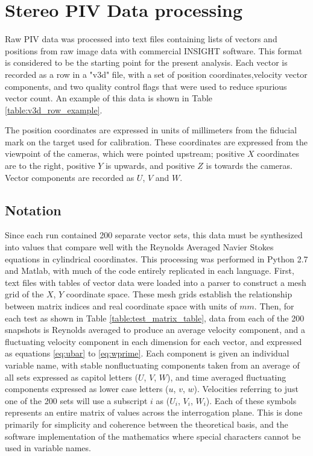 \section{Stereo PIV Data processing}

Raw PIV data was processed into text files containing lists of vectors and 
positions from raw image data with commercial INSIGHT software. 
This format is considered to be the 
starting point for the present analysis. Each vector is recorded as a row in a 
"v3d" file, with a set of position coordinates,velocity 
vector components, and two quality control flags that were used to reduce 
spurious vector count. An example of this data is shown in Table 
\ref{table:v3d_row_example}.



The position coordinates are expressed in units of millimeters from 
the fiducial mark on the target used for calibration. These coordinates are 
expressed from the viewpoint of the cameras, which were pointed upstream; 
positive $X$ coordinates are to the right, positive $Y$ is upwards, and 
positive $Z$ is towards the cameras. Vector components are recorded as $U$, 
$V$ and $W$. 

\subsection{Notation}
Since each run contained 200 separate vector sets, this data must be 
synthesized into 
values that compare well with the Reynolds Averaged Navier Stokes equations in 
cylindrical coordinates. This processing was performed in Python 2.7 and 
Matlab, with much of the code entirely replicated in each language. 
First, text files with tables of vector data were loaded into a parser to 
construct a mesh grid of the $X$, $Y$ coordinate space. These mesh grids 
establish the relationship between matrix indices and real coordinate 
space with units of $mm$.
Then, for each test as shown in Table \ref{table:test_matrix_table}, data from 
each of the 200 snapshots is Reynolds averaged to produce an average velocity 
component, and a fluctuating velocity component in each dimension for each 
vector, and expressed as equations \ref{eq:ubar} to \ref{eq:wprime}. 
Each component is given an individual variable name, with stable nonfluctuating 
components taken from an average of all sets expressed as capitol letters ($U$, 
$V$, $W$), and time averaged fluctuating components expressed as lower case 
letters ($u$, $v$, $w$). 
Velocities referring to just one of the 200 sets will use a 
subscript $i$ as ($U_i$, $V_i$, $W_i$). Each of these symbols represents an 
entire matrix of values across the interrogation plane. This is done primarily 
for simplicity and coherence between the theoretical basis, and the software 
implementation of 
the mathematics where special characters cannot be used in variable names.


